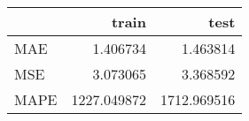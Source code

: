 \begin{tabular}{lrr}
\toprule
{} &        train &         test \\
\midrule
MAE  &     1.406734 &     1.463814 \\
MSE  &     3.073065 &     3.368592 \\
MAPE &  1227.049872 &  1712.969516 \\
\bottomrule
\end{tabular}
